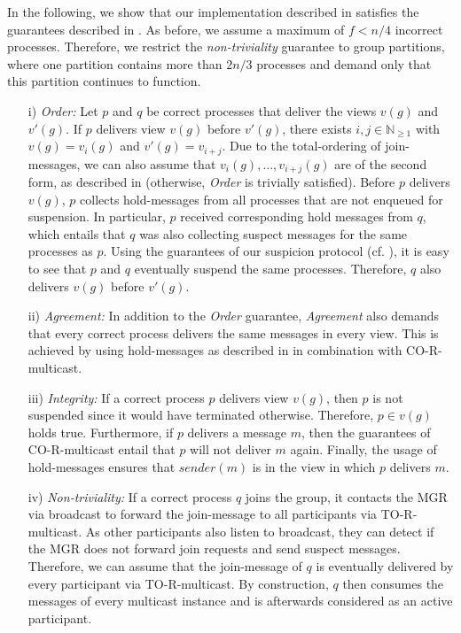 \documentclass[runningheads]{llncs}
\begin{document}
In the following, we show that our implementation described in  satisfies the guarantees described in \cite[p.~772-773]{ds_book}. As before, we assume a maximum of $f < n/4$ incorrect processes. Therefore, we restrict the \textit{non-triviality} guarantee to group partitions, where one partition contains more than $2n/3$ processes and demand only that this partition continues to function.
\begin{enumerate}
    \item[i)] \textit{Order:} Let $p$ and $q$ be correct processes that deliver the views $v(g)$ and $v'(g)$. If $p$ delivers view $v(g)$ before $v'(g)$, there exists $i, j \in \mathbb{N}_{\geq 1}$ with $v(g) = v_i(g)$ and $v'(g) = v_{i+j}$. Due to the total-ordering of join-messages, we can also assume that $v_i(g), \ldots, v_{i+j}(g)$ are of the second form, as described in  (otherwise, \textit{Order} is trivially satisfied). Before $p$ delivers $v(g)$, $p$ collects hold-messages from all processes that are not enqueued for suspension. In particular, $p$ received corresponding hold messages from $q$, which entails that $q$ was also collecting suspect messages for the same processes as $p$. Using the guarantees of our suspicion protocol (cf. ), it is easy to see that $p$ and $q$ eventually suspend the same processes. Therefore, $q$ also delivers $v(g)$ before $v'(g)$.
    \item[ii)] \textit{Agreement:} In addition to the \textit{Order} guarantee, \textit{Agreement} also demands that every correct process delivers the same messages in every view. This is achieved by using hold-messages as described in  in combination with CO-R-multicast. 
    \item[iii)] \textit{Integrity:} If a correct process $p$ delivers view $v(g)$, then $p$ is not suspended since it would have terminated otherwise. Therefore, $p \in v(g)$ holds true. Furthermore, if $p$ delivers a message $m$, then the guarantees of CO-R-multicast entail that $p$ will not deliver $m$ again. Finally, the usage of hold-messages ensures that $sender(m)$ is in the view in which $p$ delivers $m$.
    \item[iv)] \textit{Non-triviality:} If a correct process $q$ joins the group, it contacts the MGR via broadcast to forward the join-message to all participants via TO-R-multicast. As other participants also listen to broadcast, they can detect if the MGR does not forward join requests and send suspect messages. Therefore, we can assume that the join-message of $q$ is eventually delivered by every participant via TO-R-multicast. By construction, $q$ then consumes the messages of every multicast instance and is afterwards considered as an active participant.
    

\end{enumerate}
\end{document}
